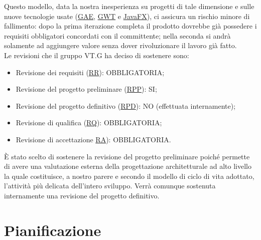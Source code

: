 Questo modello, data la nostra inesperienza su progetti di tale dimensione e
sulle nuove tecnologie usate (\underline{GAE}, \underline{GWT} e
\underline{JavaFX}), ci assicura un rischio minore di fallimento: dopo la prima iterazione completa il prodotto dovrebbe
gi\`a possedere i requisiti obbligatori concordati con il committente; nella
seconda si andr\`a solamente ad aggiungere valore senza dover rivoluzionare il
lavoro gi\`a fatto.\\

Le revisioni che il gruppo VT.G ha deciso di sostenere sono:
\begin{itemize}
  \item Revisione dei requisiti (\underline{RR}): OBBLIGATORIA;
  \item Revisione del progetto preliminare (\underline{RPP}): SI;
  \item Revisione del progetto definitivo (\underline{RPD}): NO (effettuata
  internamente);
  \item Revisione di qualifica (\underline{RQ}): OBBLIGATORIA;
  \item Revisione di accettazione \underline{RA}): OBBLIGATORIA.
\end{itemize} \vspace{0.5cm}

\`E stato scelto di sostenere la revisione del progetto preliminare poich\'e
permette di avere una valutazione esterna della progettazione architetturale ad
alto livello la quale costituisce, a nostro parere e secondo il modello di ciclo
di vita adottato, l'attivit\`a pi\`u delicata dell'intero sviluppo.
Verr\`a comunque sostenuta internamente una revisione del progetto definitivo.

\chapter{Pianificazione}
\thispagestyle{fancy}

